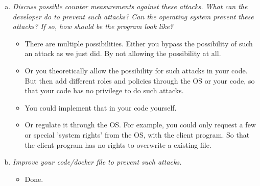 \begin{enumerate}[(a)]
    \item {\itshape Discuss possible counter measurements against these attacks. What can the developer do to prevent such attacks? Can the operating system prevent these attacks? If so, how should be the program look like?}
    \begin{itemize}
        \item There are multiple possibilities. Either you bypass the possibility of such an attack as we just did. By not allowing the possibility at all.
        \item Or you theoretically allow the possibility for such attacks in your code. But then add different roles and policies through the OS or your code, so that your code has no privilege to do such attacks.
        \item You could implement that in your code yourself.
        \item Or regulate it through the OS. For example, you could only request a few or special 'system rights' from the OS, with the client program. So that the client program has no rights to overwrite a existing file.
    \end{itemize}
    
    \item {\itshape Improve your code/docker file to prevent such attacks.}
    \begin{itemize}
        \item Done.
    \end{itemize}

\end{enumerate}

